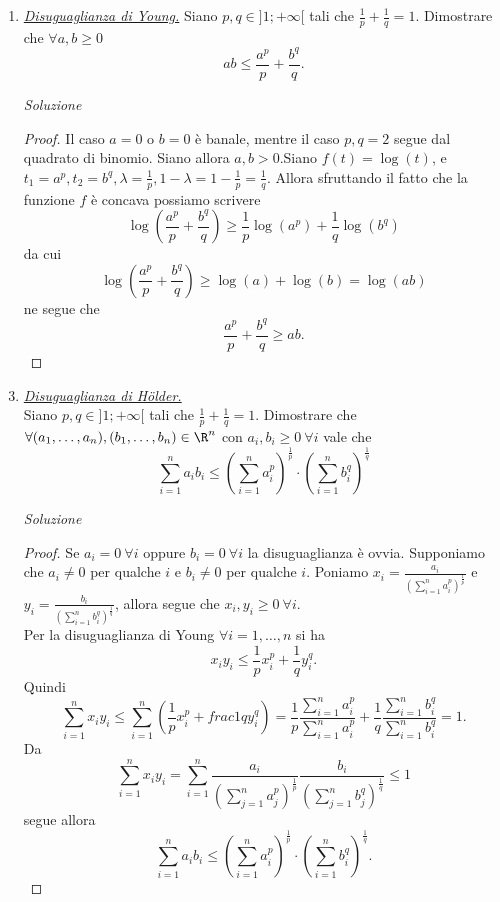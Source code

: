 \documentclass{article}
\begin{document}
\begin{enumerate}[label=\textbf{Esercizio 12.\arabic*.},itemindent=*]
\begin{proof}
    \[(x - y)\frac{f(y +\lambda(x - y))- f(y)}{\lambda(x - y)} \leq f(x) - f(y)\]
    Passando al limite per $\lambda\to 0^+$, dalla derivabilità di $f$ segue 
    \[(x - y)f'(y)\leq f(x) - f(y)\]
    ossia 
    \[f(x)\geq f(y) + f'(y)(x - y).\]
    Per l'arbitrarietà di $x,y\in \R$, la dimostrazione è conclusa.
\end{proof}
\item \underline{\textit{Disuguaglianza di Young.}} Siano $p, q\in ]1;+\infty[$ tali che $\frac{1}{p}+\frac{1}{q}=1$. Dimostrare che $\forall a,b\geq 0$ 
\[ab\leq \frac{a^p}{p}+\frac{b^q}{q}.\]
\item[\textit{\large Soluzione~}]~
\begin{proof}
    Il caso $a=0$ o $b=0$ è banale, mentre il caso $p,q=2$ segue dal quadrato di binomio. Siano allora $a,b>0$.Siano $f(t)=\log(t)$, e $t_1=a^p, t_2=b^q, \lambda =\frac{1}{p}, 1-\lambda=1-\frac{1}{p}=\frac{1}{q}$.
    Allora sfruttando il fatto che la funzione $f$ è concava possiamo scrivere
    \[\log\left( \frac{a^p}{p}+\frac{b^q}{q} \right)\geq \frac{1}{p}\log(a^p) +\frac{1}{q}\log(b^q)\]
    da cui
    \[\log\left( \frac{a^p}{p}+\frac{b^q}{q} \right)\geq \log(a)+\log(b)=\log(ab)\]
    ne segue che 
    \[\frac{a^p}{p}+\frac{b^q}{q}\geq ab.\]
\end{proof}
\item \underline{\textit{Disuguaglianza di Hölder.}} \\Siano $p, q\in ]1;+\infty[$ tali che $\frac{1}{p}+\frac{1}{q}=1$. Dimostrare che $\forall (a_1, \dots, a_n), (b_1,\dots, b_n)\in \R^n$ con $a_i, b_i\geq 0~\forall i$ vale che 
\[\sum_{i=1}^n a_ib_i\leq \left(\sum_{i=1}^na_i^p\right)^{\frac{1}{p}}\cdot\left(\sum_{i=1}^nb_i^q\right)^{\frac{1}{q}}\]
\item[\textit{\large Soluzione~}]~
\begin{proof}
   Se $a_i=0~\forall i$ oppure $b_i=0~\forall i$ la disuguaglianza è ovvia. Supponiamo che $a_i\neq 0$ per qualche $i$ e $b_i\neq 0$ per qualche $i$. Poniamo $x_i=\frac{a_i}{\left(\sum\limits_{i=1}^na_i^p\right)^{\frac{1}{p}}}$ e $y_i=\frac{b_i}{\left(\sum\limits_{i=1}^nb_i^q\right)^{\frac{1}{q}}}$, allora segue che $x_i,y_i\geq 0~\forall i$.
   \\Per la disuguaglianza di Young $\forall i=1, \dots, n$ si ha
   \[x_iy_i\leq \frac{1}{p}x_i^p+\frac{1}{q}y_i^q.\]
   Quindi 
   \[\sum\limits_{i=1}^nx_iy_i\leq\sum\limits_{i=1}^n\left( \frac{1}{p}x_i^p+frac{1}{q}y_i^q\right)=\frac{1}{p}\frac{\sum\limits_{i=1}^na_i^p}{\sum\limits_{i=1}^na_i^p}+\frac{1}{q}\frac{\sum\limits_{i=1}^nb_i^q}{\sum\limits_{i=1}^nb_i^q}=1.\]
   Da
   \[\sum_{i = 1}^nx_iy_i =\sum_{i = 1}^n\frac{a_i}{(\sum_{j = 1}^n a_j^p)^{\frac{1}{p}}}\frac{b_i}{(\sum_{j = 1}^n b_j^q)^{\frac{1}{q}}}\leq 1\]
   segue allora
   \[\sum_{i=1}^n a_ib_i\leq \left(\sum_{i=1}^na_i^p\right)^{\frac{1}{p}} \cdot \left(\sum_{i=1}^nb_i^q\right)^{\frac{1}{q}}.\]
\end{proof}


\end{enumerate}
\end{document}
